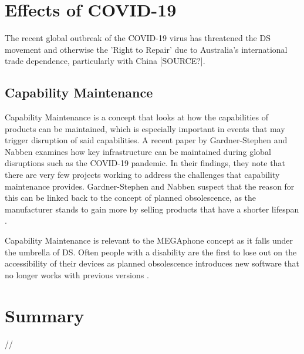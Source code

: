 
\section{Effects of COVID-19}
The recent global outbreak of the COVID-19 virus has threatened the DS movement and otherwise the 'Right to Repair' due to Australia's international trade dependence, particularly with China [SOURCE?].

\subsection{Capability Maintenance} %

Capability Maintenance is a concept that looks at how the capabilities of products can be maintained, which is especially important in events that may trigger disruption of said capabilities.
A recent paper by Gardner-Stephen and Nabben \cite{capability} examines how key infrastructure can be maintained during global disruptions such as the COVID-19 pandemic.
In their findings, they note that there are very few projects working to address the challenges that capability maintenance provides.
Gardner-Stephen and Nabben suspect that the reason for this can be linked back to the concept of planned obsolescence, as the manufacturer stands to gain more by selling products that have a shorter lifespan \cite{obsolescence2}.

Capability Maintenance is relevant to the MEGAphone concept as it falls under the umbrella of DS.
Often people with a disability are the first to lose out on the accessibility of their devices as planned obsolescence introduces new software that no longer works with previous versions \cite{obsolescence2}.


\section{Summary}
//

